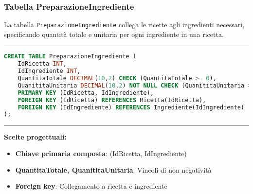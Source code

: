 \subsubsection{Tabella PreparazioneIngrediente}

La tabella \texttt{PreparazioneIngrediente} collega le ricette agli ingredienti necessari, specificando quantità totale e unitaria per ogni ingrediente in una ricetta.

\noindent\rule{\textwidth}{0.4pt}
\begin{lstlisting}[language=SQL, style=sqlstyle]
CREATE TABLE PreparazioneIngrediente (
    IdRicetta INT,
    IdIngrediente INT,
    QuantitaTotale DECIMAL(10,2) CHECK (QuantitaTotale >= 0),
    QuanititaUnitaria DECIMAL(10,2) NOT NULL CHECK (QuanititaUnitaria >= 0),
    PRIMARY KEY (IdRicetta, IdIngrediente),
    FOREIGN KEY (IdRicetta) REFERENCES Ricetta(IdRicetta),
    FOREIGN KEY (IdIngrediente) REFERENCES Ingrediente(IdIngrediente)
);
\end{lstlisting}
\noindent\rule{\textwidth}{0.4pt}

\textbf{Scelte progettuali:}
\begin{itemize}
    \item \textbf{Chiave primaria composta}: (IdRicetta, IdIngrediente)
    \item \textbf{QuantitaTotale, QuanititaUnitaria}: Vincoli di non negatività
    \item \textbf{Foreign key}: Collegamento a ricetta e ingrediente
\end{itemize}

